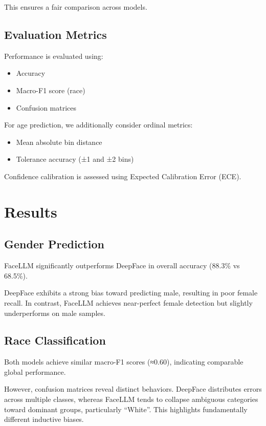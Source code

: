 \documentclass[a4paper,11pt,twocolumn]{article}
\begin{document}
This ensures a fair comparison across models.

\subsection{Evaluation Metrics}

Performance is evaluated using:

\begin{itemize}
    \item Accuracy
    \item Macro-F1 score (race)
    \item Confusion matrices
\end{itemize}

For age prediction, we additionally consider ordinal metrics:

\begin{itemize}
    \item Mean absolute bin distance
    \item Tolerance accuracy (±1 and ±2 bins)
\end{itemize}

Confidence calibration is assessed using Expected Calibration Error (ECE).

\section{Results}

\subsection{Gender Prediction}

FaceLLM significantly outperforms DeepFace in overall accuracy (88.3\% vs 68.5\%). 

DeepFace exhibits a strong bias toward predicting male, resulting in poor female recall. In contrast, FaceLLM achieves near-perfect female detection but slightly underperforms on male samples.

\subsection{Race Classification}

Both models achieve similar macro-F1 scores (≈0.60), indicating comparable global performance.

However, confusion matrices reveal distinct behaviors. DeepFace distributes errors across multiple classes, whereas FaceLLM tends to collapse ambiguous categories toward dominant groups, particularly ``White''. This highlights fundamentally different inductive biases.
\end{document}
